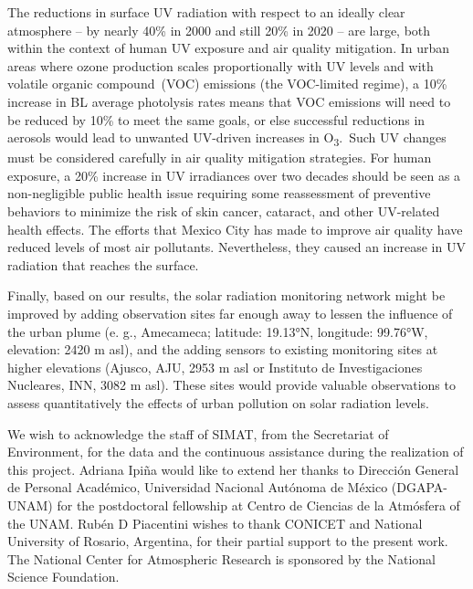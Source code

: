 \documentclass[journal=jacsat,manuscript=article]{achemso}
\begin{document}
The reductions in surface UV radiation with respect to an ideally clear
atmosphere -- by nearly 40\% in 2000 and still 20\% in 2020 -- are
large, both within the context of human UV exposure and air quality
mitigation. In urban areas where ozone production scales proportionally
with UV levels and with volatile organic compound~(VOC) emissions (the
VOC-limited regime), a 10\% increase in BL average photolysis rates
means that VOC emissions will need to be reduced by 10\% to meet the
same goals, or else successful reductions in aerosols would lead to
unwanted UV-driven increases in O\textsubscript{3}.~Such UV changes must
be considered carefully in air quality mitigation strategies. For human
exposure, a 20\% increase in UV irradiances over two decades should be
seen as a non-negligible public health issue requiring some reassessment
of preventive behaviors to minimize the risk of skin cancer, cataract,
and other UV-related health effects. The efforts that Mexico City has
made to improve air quality have reduced levels
of most air pollutants. Nevertheless, they caused an increase in UV
radiation that reaches the surface.

Finally, based on our results, the solar radiation monitoring network might
be improved by adding observation sites far enough away to lessen the
influence of the urban plume (e. g., Amecameca; latitude: 19.13°N, longitude: 99.76°W, elevation: 2420 m asl),
and the adding sensors to existing monitoring sites at higher elevations
(Ajusco, AJU, 2953 m asl or Instituto de Investigaciones Nucleares, INN, 3082 m asl).
These sites would provide valuable observations to assess quantitatively the effects of urban pollution on solar radiation levels.


\begin{acknowledgement}
  We wish to acknowledge the staff of SIMAT, from the Secretariat of
  Environment, for the data and the continuous assistance during the
  realization of this project. Adriana Ipiña would like to extend her
  thanks to Dirección General de Personal Académico, Universidad
  Nacional Autónoma de México (DGAPA-UNAM) for the postdoctoral fellowship
  at Centro de Ciencias de la Atmósfera of the UNAM. Rubén D Piacentini
  wishes to thank CONICET and National University of Rosario, Argentina,
  for their partial support to the present work. The National Center for
  Atmospheric Research is sponsored by the National Science Foundation.
\end{acknowledgement}
\end{document}
